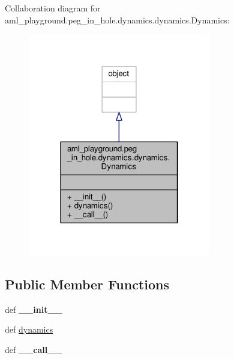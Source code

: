 Collaboration diagram for aml\-\_\-playground.\-peg\-\_\-in\-\_\-hole.\-dynamics.\-dynamics.\-Dynamics\-:
\nopagebreak
\begin{figure}[H]
\begin{center}
\leavevmode
\includegraphics[width=226pt]{classaml__playground_1_1peg__in__hole_1_1dynamics_1_1dynamics_1_1_dynamics__coll__graph}
\end{center}
\end{figure}
\subsection*{Public Member Functions}
\begin{DoxyCompactItemize}
\item 
\hypertarget{classaml__playground_1_1peg__in__hole_1_1dynamics_1_1dynamics_1_1_dynamics_ae6f9de7c2ee1a304065c6a8664364773}{def {\bfseries \-\_\-\-\_\-init\-\_\-\-\_\-}}\label{classaml__playground_1_1peg__in__hole_1_1dynamics_1_1dynamics_1_1_dynamics_ae6f9de7c2ee1a304065c6a8664364773}

\item 
def \hyperlink{classaml__playground_1_1peg__in__hole_1_1dynamics_1_1dynamics_1_1_dynamics_a3a69bd154a9b4dad327611e6f3731ffe}{dynamics}
\item 
\hypertarget{classaml__playground_1_1peg__in__hole_1_1dynamics_1_1dynamics_1_1_dynamics_a4474de680879bd3da0fc29c1fa7cffbb}{def {\bfseries \-\_\-\-\_\-call\-\_\-\-\_\-}}\label{classaml__playground_1_1peg__in__hole_1_1dynamics_1_1dynamics_1_1_dynamics_a4474de680879bd3da0fc29c1fa7cffbb}

\end{DoxyCompactItemize}


